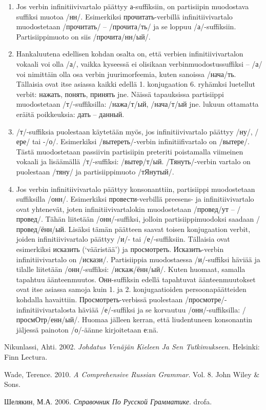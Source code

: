 \documentclass[]{scrartcl}
\providecommand{\tightlist}{%
  \setlength{\itemsep}{0pt}\setlength{\parskip}{0pt}}
\begin{document}
\begin{enumerate}
\def\labelenumi{\arabic{enumi}.}
\tightlist
\item
  Jos verbin infinitiivivartalo päättyy а-suffiksiin, on partisiipin
  muodostava suffiksi muotoa /нн/. Esimerkiksi прочитать-verbillä
  infinitiivivartalo muodostetaan /прочитать/ -- /прочита/ть/ ja se
  loppuu /а/-suffiksiin. Partisiippimuoto on siis /прочита/нн/ый/.
\item
  Hankaluutena edellisen kohdan osalta on, että verbien
  infinitiivivartalon vokaali voi olla /а/, vaikka kyseessä ei olisikaan
  verbinmuodostussuffiksi -- /а/ voi nimittäin olla osa verbin
  juurimorfeemia, kuten sanoissa /нача/ть. Tällaisia ovat itse asiassa
  kaikki edellä 1. konjugaation 6. ryhämksi luetellut verbit: нажать,
  понять, принять jne. Näissä tapauksissa partisiippi muodostetaan
  /т/-suffiksilla: /нажа/т/ый, /нача/т/ый jne. lukuun ottamatta eräitä
  poikkeuksia: дать -- данный.
\item
  /т/-suffiksia puolestaan käytetään myös, jos infinitiivivartalo
  päättyy /ну/, /ере/ tai -/о/. Esimerkiksi /вытереть/-verbin
  infinitiifivartalo on /вытере/. Tästä muodostetaan passiivin
  partisiipin preteriti poistamalla viimeinen vokaali ja lisäämällä
  /т/-suffiksi: /вытер/т/ый. /Тянуть/-verbin vartalo on puolestaan
  /тяну/ ja partisiippimuoto /тЯнутый/.
\item
  Jos verbin infinitiivivartalo päättyy konsonanttiin, partisiippi
  muodostetaan suffiksilla /онн/. Esimerkiksi провести-verbillä
  preesens- ja infinitiivivartalo ovat yhtenevät, joten
  infinitiivivartalokin muodostetaan /провед/ут -- /провед/. Tähän
  liitetään /онн/-suffiksi, jolloin partisiippimuodoksi saadaan
  /провед/ённ/ый. Lisäksi tämän päätteen saavat toisen konjugaation
  verbit, joiden infinitiivivartalo päättyy /и/- tai /е/-suffiksiin.
  Tällaisia ovat esimerkiksi исказить (`vääristää') ja просмотреть.
  Исказить-verbin infinitiivivartalo on /искази/. Partisiippia
  muodostaessa /и/-suffiksi häviää ja tilalle liitetään /онн/-suffiksi:
  /искаж/ённ/ый/. Kuten huomaat, samalla tapahtuu äänteenmuutos.
  Онн-suffiksin edellä tapahtuvat äänteenmuutokset ovat itse asiassa
  samoja kuin 1. ja 2. konjugaatioiden persoonapäätteiden kohdalla
  havaittiin. Просмотреть-verbissä puolestaan
  /просмотре/-infinitiivivartalosta häviää /е/-suffiksi ja se korvautuu
  /онн/-suffiksilla: /просмОтр/енн/ый/. Huomaa jälleen kerran, että
  liudentuneen konsonantin jäljessä painoton /о/-äänne kirjoitetaan
  е:nä.
\end{enumerate}

Nikunlassi, Ahti. 2002. \emph{Johdatus Venäjän Kieleen Ja Sen
Tutkimukseen}. Helsinki: Finn Lectura.

Wade, Terence. 2010. \emph{A Comprehensive Russian Grammar}. Vol. 8.
John Wiley \& Sons.

Шелякин, М.А. 2006. \emph{Справочник По Русской Грамматике}. drofa.
\end{document}
